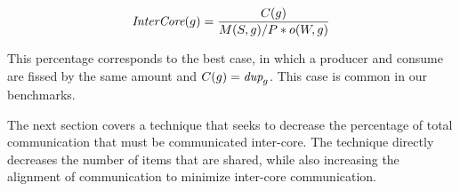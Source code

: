 \begin{equation}
\label{eq:min-dup}
\mbox{\it InterCore}(g) = \frac{C(g)}{M(S,g) / P * o(W, g)}
\end{equation}

\noindent This percentage corresponds to the best case, in which a
producer and consume are fissed by the same amount and $C(g) =
\mbox{\it dup}_g$.  This case is common in our benchmarks.

The next section covers a technique that seeks to decrease the percentage
of total communication that must be communicated inter-core.  The
technique directly decreases the number of items that are shared,
while also increasing the alignment of communication to minimize
inter-core communication.
